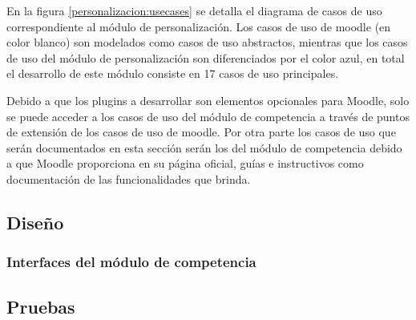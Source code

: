  En la figura \ref{personalizacion:usecases} se detalla el diagrama de casos de uso correspondiente al módulo
 de personalización. Los casos de uso de moodle (en color blanco) son modelados como casos de uso
 abstractos, mientras que los casos de uso del módulo de personalización son diferenciados por el
 color azul, en total el desarrollo de este módulo consiste en 17 casos de uso principales.


 \noindent
 Debido a que los plugins a desarrollar son elementos opcionales para Moodle, solo se puede
 acceder a los casos de uso del módulo de competencia a través de puntos de extensión de los
 casos de uso de moodle. Por otra parte los casos de uso que serán documentados en esta sección
 serán los del módulo de competencia debido a que Moodle proporciona en su página oficial, guías
 e instructivos como documentación de las funcionalidades que brinda.



\clearpage
\subsection{Diseño}

\subsubsection{Interfaces del módulo de competencia}

    
    
    
    





\subsection{Pruebas}


